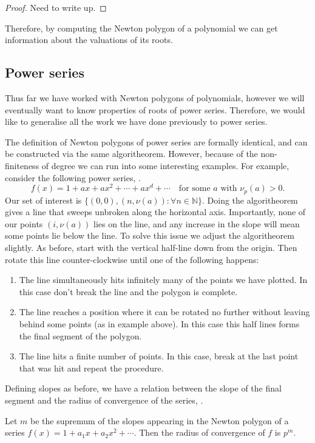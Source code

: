 \begin{proof}
  Need to write up.
\end{proof}

Therefore, by computing the Newton polygon of a polynomial we can get information about the
valuations of its roots.

\subsection{Power series}

Thus far we have worked with Newton polygons of polynomials, however we will eventually want to
know properties of roots of power series. Therefore, we would like to generalise all the work we
have done previously to power series.

The definition of Newton polygons of power series are formally identical, and can be constructed
via the same algoritheorem. However, because of the non-finiteness of degree we can run into some
interesting examples.
For example, consider the following power series, \cite[Page~260]{Gouvea}.
\[
f(x) = 1 + a x + ax^2 + \cdots +a x^d +\cdots \quad \text{for some } a \text{ with } \nu_p(a) > 0.
\]
Our set of interest is $\{(0,0),(n,\nu (a))  : \forall n \in \mathbb{N} \}.$ Doing the algoritheorem
gives a line that sweeps unbroken along the horizontal axis. Importantly, none of our points
$(i, \nu (a))$ lies on the line, and any increase in the slope will mean some points lie below the
line.
To solve this issue we adjust the algoritheorem slightly. As before, start with the vertical half-line
down from the origin. Then rotate this line counter-clockwise until one of the following happens:
\begin{enumerate}
    \item The line simultaneously hits infinitely many of the points we have plotted.
    In this case don't break the line and the polygon is complete.
    \item The line reaches a position where it can be rotated no further without leaving behind some
    points (as in example above). In this case this half lines forms the final segment of the
    polygon.
    \item The line hits a finite number of points. In this case, break at the last point that was
    hit and repeat the procedure.
\end{enumerate}

Defining slopes as before, we have a relation between the slope of the final segment and the
radius of convergence of the series, \cite[Lemma~7.4.8]{Gouvea}.
\begin{theorem} \label{RadofCon}
    Let $m$ be the supremum of the slopes appearing in the Newton polygon of a series
    $f(x) = 1 + a_1 x + a_2 x^2 + \cdots$. Then the radius of convergence of $f$ is $p^m.$
\end{theorem}

